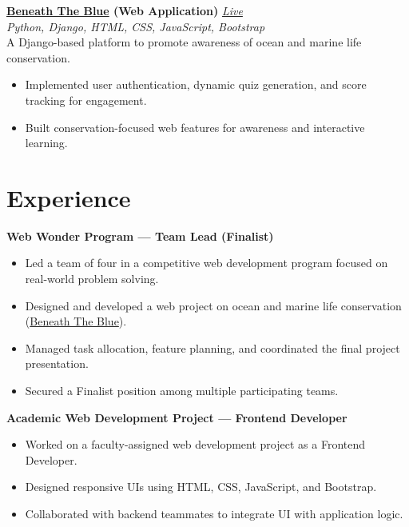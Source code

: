 \documentclass[a4paper,10pt]{article}
\begin{document}
\vspace{1mm}
\noindent\textbf{\href{https://beneath-the-blue-1-3c6o.onrender.com/}{Beneath The Blue} (Web Application)}
\hfill \href{https://beneath-the-blue-1-3c6o.onrender.com/}{\textit{\small Live}}\\
\textit{\small Python, Django, HTML, CSS, JavaScript, Bootstrap}\\[0.5mm]
A Django-based platform to promote awareness of ocean and marine life conservation.
\begin{itemize}
  \item Implemented user authentication, dynamic quiz generation, and score tracking for engagement.
  \item Built conservation-focused web features for awareness and interactive learning.
\end{itemize}

\section{Experience}
\vspace{0.8mm}
\noindent\textbf{Web Wonder Program --- Team Lead (Finalist)}
\begin{itemize}
  \item Led a team of four in a competitive web development program focused on real-world problem solving.
  \item Designed and developed a web project on ocean and marine life conservation (\href{https://beneath-the-blue-1-3c6o.onrender.com/}{Beneath The Blue}).
  \item Managed task allocation, feature planning, and coordinated the final project presentation.
  \item Secured a Finalist position among multiple participating teams.
\end{itemize}

\vspace{0.8mm}
\noindent\textbf{Academic Web Development Project --- Frontend Developer}
\begin{itemize}
  \item Worked on a faculty-assigned web development project as a Frontend Developer.
  \item Designed responsive UIs using HTML, CSS, JavaScript, and Bootstrap.
  \item Collaborated with backend teammates to integrate UI with application logic.
\end{itemize}
\end{document}
